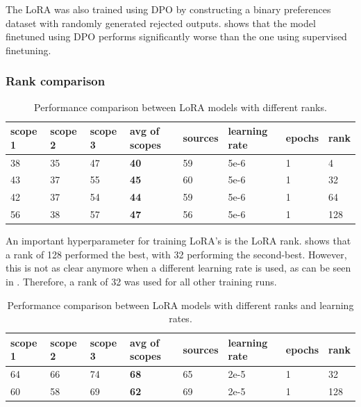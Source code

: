 \documentclass[]{article}
\begin{document}
The LoRA was also trained using DPO \cite{DBLP:conf/nips/RafailovSMMEF23} by constructing a binary preferences dataset with randomly generated rejected outputs.  shows that the model finetuned using DPO performs significantly worse than the one using supervised finetuning.

\subsubsection{Rank comparison}

\begin{table}[h]
	\centering
	\begin{tabular}{|l|l|l|l|l|l|l|l|}
		\hline
		scope 1 & scope 2 & scope 3 & avg of scopes & sources & learning rate & epochs & rank \\\hline
		38 & 35 & 47 & \textbf{40} & 59 & 5e-6 & 1 & 4 \\\hline
		43 & 37 & 55 & \textbf{45} & 60 & 5e-6 & 1 & 32 \\\hline
		42 & 37 & 54 & \textbf{44} & 59 & 5e-6 & 1 & 64 \\\hline
		56 & 38 & 57 & \textbf{47} & 56 & 5e-6 & 1 & 128 \\\hline
	\end{tabular}
	\caption{Performance comparison between LoRA models with different ranks.}
	\label{tab:rank-comparison}
\end{table}

An important hyperparameter for training LoRA's is the LoRA rank.  shows that a rank of 128 performed the best, with 32 performing the second-best. However, this is not as clear anymore when a different learning rate is used, as can be seen in . Therefore, a rank of 32 was used for all other training runs.

\begin{table}[h]
	\centering
	\begin{tabular}{|l|l|l|l|l|l|l|l|}
		\hline
		scope 1 & scope 2 & scope 3 & avg of scopes & sources & learning rate & epochs & rank \\\hline
		64 & 66 & 74 & \textbf{68} & 65 & 2e-5 & 1 & 32 \\\hline
		60 & 58 & 69 & \textbf{62} & 69 & 2e-5 & 1 & 128 \\\hline
	\end{tabular}
	\caption{Performance comparison between LoRA models with different ranks and learning rates.}
	\label{tab:rank-lr-comparison}
\end{table}
\end{document}
